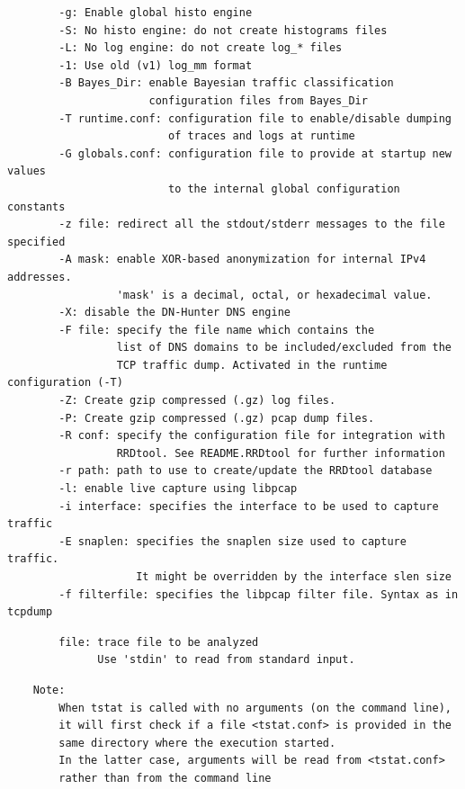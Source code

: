 \documentclass[11pt]{article}
\begin{document}
\begin{small}\begin{verbatim}
        -g: Enable global histo engine
        -S: No histo engine: do not create histograms files 
        -L: No log engine: do not create log_* files 
        -1: Use old (v1) log_mm format
        -B Bayes_Dir: enable Bayesian traffic classification
                      configuration files from Bayes_Dir
        -T runtime.conf: configuration file to enable/disable dumping
                         of traces and logs at runtime
        -G globals.conf: configuration file to provide at startup new values
                         to the internal global configuration constants     
        -z file: redirect all the stdout/stderr messages to the file specified
        -A mask: enable XOR-based anonymization for internal IPv4 addresses.
                 'mask' is a decimal, octal, or hexadecimal value.
        -X: disable the DN-Hunter DNS engine 
        -F file: specify the file name which contains the
                 list of DNS domains to be included/excluded from the
                 TCP traffic dump. Activated in the runtime configuration (-T)
        -Z: Create gzip compressed (.gz) log files.
        -P: Create gzip compressed (.gz) pcap dump files.
        -R conf: specify the configuration file for integration with
                 RRDtool. See README.RRDtool for further information
        -r path: path to use to create/update the RRDtool database
        -l: enable live capture using libpcap
        -i interface: specifies the interface to be used to capture traffic
        -E snaplen: specifies the snaplen size used to capture traffic.
                    It might be overridden by the interface slen size
        -f filterfile: specifies the libpcap filter file. Syntax as in tcpdump
\end{verbatim}\end{small} \noindent
\begin{small}\begin{verbatim}
        file: trace file to be analyzed
              Use 'stdin' to read from standard input.
\end{verbatim}\end{small} \noindent
\begin{small}\begin{verbatim}
    Note:
        When tstat is called with no arguments (on the command line),
        it will first check if a file <tstat.conf> is provided in the
        same directory where the execution started.
        In the latter case, arguments will be read from <tstat.conf>
        rather than from the command line
\end{verbatim}\end{small} \noindent
\end{document}
